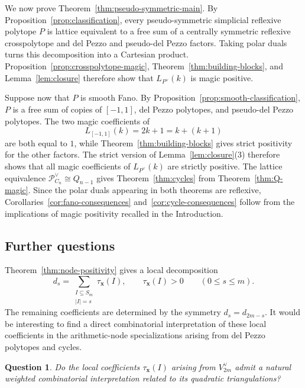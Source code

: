 \documentclass[10pt,a4paper]{amsart}
\newtheorem{Question}[Theorem]{Question}
\theoremstyle{definition}
\newcommand{\PP}{\mathcal P}
\begin{document}
We now prove Theorem~\ref{thm:pseudo-symmetric-main}.
By Proposition~\ref{prop:classification}, every pseudo-symmetric
simplicial reflexive polytope $P$ is lattice equivalent to a free sum
of a centrally symmetric reflexive crosspolytope and del Pezzo and
pseudo-del Pezzo factors.
Taking polar duals turns this decomposition into a Cartesian product.
Proposition~\ref{prop:crosspolytope-magic},
Theorem~\ref{thm:building-blocks}, and Lemma~\ref{lem:closure}
therefore show that $L_{P^\vee}(k)$ is magic positive.

Suppose now that $P$ is smooth Fano.
By Proposition~\ref{prop:smooth-classification}, $P$ is a free sum of
copies of $[-1,1]$, del Pezzo polytopes, and pseudo-del Pezzo polytopes.
The two magic coefficients of
\[
L_{[-1,1]}(k)=2k+1=k+(k+1)
\]
are both equal to $1$, while
Theorem~\ref{thm:building-blocks} gives strict positivity for the other
factors.
The strict version of Lemma~\ref{lem:closure}(3) therefore shows that
all magic coefficients of $L_{P^\vee}(k)$ are strictly positive.
The lattice equivalence $\PP_{C_n}^\vee\cong Q_{n-1}$
\cite[Proposition~4.6 and its proof]{KonoikeCycles} gives
Theorem~\ref{thm:cycles} from Theorem~\ref{thm:Q-magic}.
Since the polar duals appearing in both theorems are reflexive,
Corollaries~\ref{cor:fano-consequences} and~\ref{cor:cycle-consequences}
follow from the implications of magic positivity recalled in the
Introduction.


\subsection{Further questions}

Theorem~\ref{thm:node-positivity} gives a local decomposition
\[
d_s
=
\sum_{\substack{I\subseteq S_m\\|I|=s}}
\tau_{\mathbf x}(I),
\qquad
\tau_{\mathbf x}(I)>0
\qquad (0\le s\le m).
\]
The remaining coefficients are determined by the symmetry
$d_s=d_{2m-s}$.
It would be interesting to find a direct combinatorial interpretation of
these local coefficients in the arithmetic-node specializations arising
from del Pezzo polytopes and cycles.

\begin{Question}
Do the local coefficients $\tau_{\mathbf x}(I)$ arising from
$V_{2m}^\vee$ admit a natural weighted combinatorial interpretation
related to its quadratic triangulations?
\end{Question}


\appendix
\end{document}
